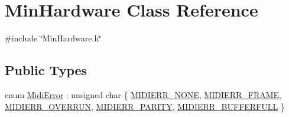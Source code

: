 \hypertarget{class_min_hardware}{}\section{Min\+Hardware Class Reference}
\label{class_min_hardware}


{\ttfamily \#include \char`\"{}Min\+Hardware.\+h\char`\"{}}

\subsection*{Public Types}
\begin{DoxyCompactItemize}
\item 
enum \hyperlink{class_min_hardware_a54ab3625bd44e1b95ba30816a6923c4a}{Midi\+Error} \+: unsigned char \{ \newline
\hyperlink{class_min_hardware_a54ab3625bd44e1b95ba30816a6923c4aa14ef09bb9e2c3ad44e4ef5d46417ebd7}{M\+I\+D\+I\+E\+R\+R\+\_\+\+N\+O\+NE}, 
\hyperlink{class_min_hardware_a54ab3625bd44e1b95ba30816a6923c4aa251e8dcc629d40ce6bbb792ec2a78586}{M\+I\+D\+I\+E\+R\+R\+\_\+\+F\+R\+A\+ME}, 
\hyperlink{class_min_hardware_a54ab3625bd44e1b95ba30816a6923c4aaf2bd267c8e20542d3439b4276878bc6d}{M\+I\+D\+I\+E\+R\+R\+\_\+\+O\+V\+E\+R\+R\+UN}, 
\hyperlink{class_min_hardware_a54ab3625bd44e1b95ba30816a6923c4aa5535af14f4bc70bc09b986c17d659911}{M\+I\+D\+I\+E\+R\+R\+\_\+\+P\+A\+R\+I\+TY}, 
\newline
\hyperlink{class_min_hardware_a54ab3625bd44e1b95ba30816a6923c4aa05279156222db9e1c979824b564f6da8}{M\+I\+D\+I\+E\+R\+R\+\_\+\+B\+U\+F\+F\+E\+R\+F\+U\+LL}
 \}
\end{DoxyCompactItemize}
